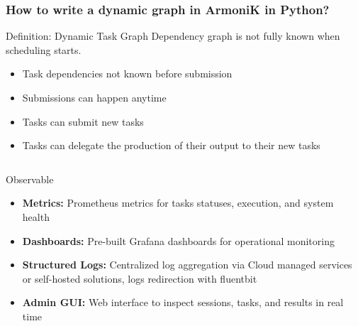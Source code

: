 \begin{frame}
	\frametitle{How to write a dynamic graph in ArmoniK in Python?}
	\begin{block}{Definition: Dynamic Task Graph}
		Dependency graph is not fully known when scheduling starts.
	\end{block}
	\begin{itemize}
		\item Task dependencies not known before submission
		\item Submissions can happen anytime
		\item Tasks can submit new tasks
		\item Tasks can delegate the production of their output to their new tasks
	\end{itemize}
	\footnotesize
	\inputminted{python}{subtasking.py}
\end{frame}

\begin{frame}{Observable}
	\begin{itemize}
		\item \textbf{Metrics:} Prometheus metrics for tasks statuses, execution, and system health
		\item \textbf{Dashboards:} Pre-built Grafana dashboards for operational monitoring
		\item \textbf{Structured Logs:} Centralized log aggregation via Cloud managed services or self-hosted solutions, logs redirection with fluentbit
		\item \textbf{Admin GUI:} Web interface to inspect sessions, tasks, and results in real time
	\end{itemize}
\end{frame}



